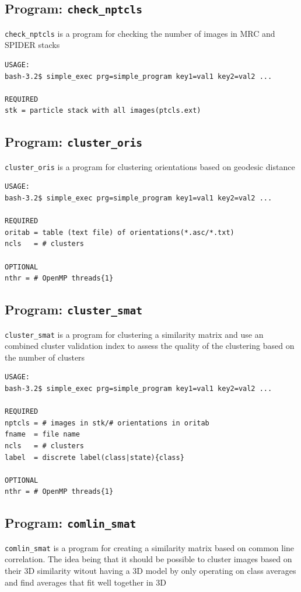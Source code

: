 \documentclass[a4paper,11pt]{article}
\newcommand{\prgname}[1]{\textcolor{NavyBlue}{\texttt{#1}}}
\begin{document}
\subsection{Program: \prgname{check\_nptcls}}
\label{check_nptcls}
\prgname{check\_nptcls} is a program for checking the number of images in MRC and SPIDER stacks

\begin{verbatim}
USAGE:
bash-3.2$ simple_exec prg=simple_program key1=val1 key2=val2 ...

REQUIRED
stk = particle stack with all images(ptcls.ext)
\end{verbatim}

\subsection{Program: \prgname{cluster\_oris}}
\label{cluster_oris}
\prgname{cluster\_oris} is a program for clustering orientations based on geodesic distance

\begin{verbatim}
USAGE:
bash-3.2$ simple_exec prg=simple_program key1=val1 key2=val2 ...

REQUIRED
oritab = table (text file) of orientations(*.asc/*.txt)
ncls   = # clusters

OPTIONAL
nthr = # OpenMP threads{1}
\end{verbatim}

\subsection{Program: \prgname{cluster\_smat}}
\label{cluster_smat}
\prgname{cluster\_smat} is a program for clustering a similarity matrix and use an combined cluster validation index to assess the quality of the clustering based on the number of clusters

\begin{verbatim}
USAGE:
bash-3.2$ simple_exec prg=simple_program key1=val1 key2=val2 ...

REQUIRED
nptcls = # images in stk/# orientations in oritab
fname  = file name
ncls   = # clusters
label  = discrete label(class|state){class}

OPTIONAL
nthr = # OpenMP threads{1}
\end{verbatim}

\subsection{Program: \prgname{comlin\_smat}}
\label{comlin_smat}
\prgname{comlin\_smat} is a program for creating a similarity matrix based on common line correlation. The idea being that it should be possible to cluster images based on their 3D similarity witout having a 3D model by only operating on class averages and find averages that fit well together in 3D
\end{document}
